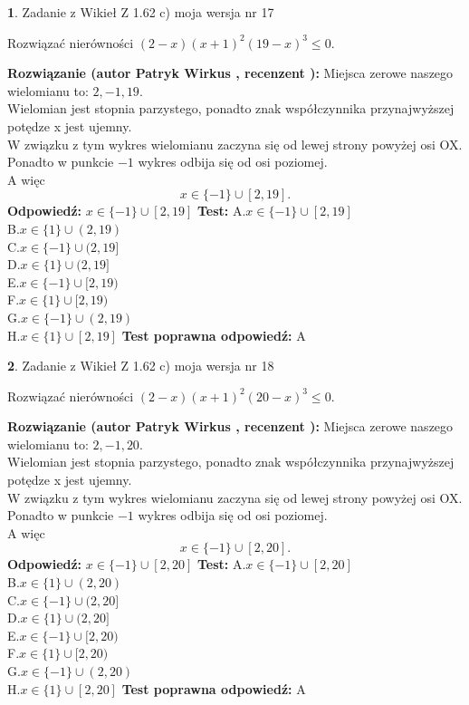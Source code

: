 \documentclass[12pt, a4paper]{article}
\theoremstyle{definition} %
\newtheorem{zad}{}
\newcommand{\zadStart}[1]{\begin{zad}#1\newline}
\newcommand{\zadStop}{\end{zad}}
\newcommand{\rozwStart}[2]{\noindent \textbf{Rozwiązanie (autor #1 , recenzent #2): }\newline}
\newcommand{\rozwStop}{\newline}
\newcommand{\odpStart}{\noindent \textbf{Odpowiedź:}\newline}
\newcommand{\odpStop}{\newline}
\newcommand{\testStart}{\noindent \textbf{Test:}\newline}
\newcommand{\testStop}{\newline}
\newcommand{\kluczStart}{\noindent \textbf{Test poprawna odpowiedź:}\newline}
\newcommand{\kluczStop}{\newline}
\begin{document}
\zadStart{Zadanie z Wikieł Z 1.62 c) moja wersja nr 17}

Rozwiązać nierówności $(2-x)(x+1)^{2}(19-x)^{3}\le0$.
\zadStop
\rozwStart{Patryk Wirkus}{}
Miejsca zerowe naszego wielomianu to: $2, -1, 19$.\\
Wielomian jest stopnia parzystego, ponadto znak współczynnika przy\linebreak najwyższej potędze x jest ujemny.\\ W związku z tym wykres wielomianu zaczyna się od lewej strony powyżej osi OX.\\
Ponadto w punkcie $-1$ wykres odbija się od osi poziomej.\\
A więc $$x \in \{-1\} \cup [2,19].$$
\rozwStop
\odpStart
$x \in \{-1\} \cup [2,19]$
\odpStop
\testStart
A.$x \in \{-1\} \cup [2,19]$\\
B.$x \in \{1\} \cup (2,19)$\\
C.$x \in \{-1\} \cup (2,19]$\\
D.$x \in \{1\} \cup (2,19]$\\
E.$x \in \{-1\} \cup [2,19)$\\
F.$x \in \{1\} \cup [2,19)$\\
G.$x \in \{-1\} \cup (2,19)$\\
H.$x \in \{1\} \cup [2,19]$
\testStop
\kluczStart
A
\kluczStop



\zadStart{Zadanie z Wikieł Z 1.62 c) moja wersja nr 18}

Rozwiązać nierówności $(2-x)(x+1)^{2}(20-x)^{3}\le0$.
\zadStop
\rozwStart{Patryk Wirkus}{}
Miejsca zerowe naszego wielomianu to: $2, -1, 20$.\\
Wielomian jest stopnia parzystego, ponadto znak współczynnika przy\linebreak najwyższej potędze x jest ujemny.\\ W związku z tym wykres wielomianu zaczyna się od lewej strony powyżej osi OX.\\
Ponadto w punkcie $-1$ wykres odbija się od osi poziomej.\\
A więc $$x \in \{-1\} \cup [2,20].$$
\rozwStop
\odpStart
$x \in \{-1\} \cup [2,20]$
\odpStop
\testStart
A.$x \in \{-1\} \cup [2,20]$\\
B.$x \in \{1\} \cup (2,20)$\\
C.$x \in \{-1\} \cup (2,20]$\\
D.$x \in \{1\} \cup (2,20]$\\
E.$x \in \{-1\} \cup [2,20)$\\
F.$x \in \{1\} \cup [2,20)$\\
G.$x \in \{-1\} \cup (2,20)$\\
H.$x \in \{1\} \cup [2,20]$
\testStop
\kluczStart
A
\kluczStop
\end{document}

